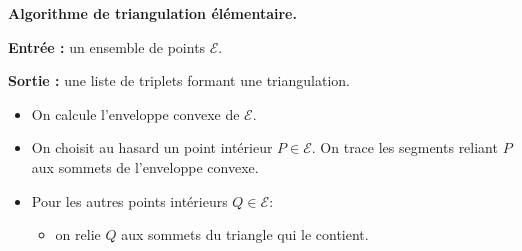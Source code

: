\documentclass[11pt,class=report,crop=false]{standalone}
\begin{document}

\begin{algorithme}	
\textbf{Algorithme de triangulation élémentaire.}

\textbf{Entrée :} un ensemble de points $\mathcal{E}$.

\textbf{Sortie :} une liste de triplets formant une triangulation.

\begin{itemize}
	\item On calcule l'enveloppe convexe de $\mathcal{E}$.
	\item On choisit au hasard un point intérieur $P \in \mathcal{E}$. On trace les segments reliant $P$ aux sommets de l'enveloppe convexe.
	\item Pour les autres points intérieurs $Q \in \mathcal{E}$:
	\begin{itemize}
		\item on relie $Q$ aux sommets du triangle qui le contient.
	\end{itemize}	
\end{itemize}
\end{algorithme}
	
\end{document}

